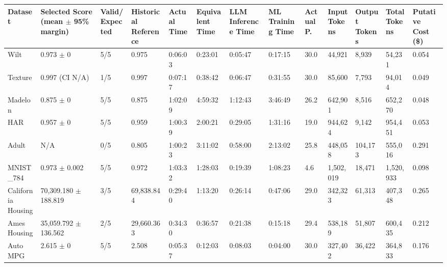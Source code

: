 \begin{tabular}{lllllllllllll}
\hline
Dataset & Selected Score (mean \ensuremath{\pm} 95\% margin) & Valid/Expected & Historical Reference & Actual Time & Equivalent Time & LLM Inference Time & ML Training Time & Actual P. & Input Tokens & Output Tokens & Total Tokens & Putative Cost (\$) \\
\hline
Wilt & 0.973 \ensuremath{\pm} 0 & 5/5 & 0.975 & 0:06:03 & 0:23:01 & 0:05:47 & 0:17:15 & 30.0 & 44,921 & 8,939 & 54,231 & 0.054 \\
Texture & 0.997 (CI N/A) & 1/5 & 0.997 & 0:07:17 & 0:38:42 & 0:06:47 & 0:31:55 & 30.0 & 85,600 & 7,793 & 94,014 & 0.049 \\
Madelon & 0.875 \ensuremath{\pm} 0 & 5/5 & 0.875 & 1:02:09 & 4:59:32 & 1:12:43 & 3:46:49 & 26.2 & 642,901 & 8,516 & 652,270 & 0.048 \\
HAR & 0.957 \ensuremath{\pm} 0 & 5/5 & 0.959 & 1:00:39 & 2:00:21 & 0:29:05 & 1:31:16 & 19.0 & 944,624 & 9,142 & 954,451 & 0.053 \\
Adult & N/A & 0/5 & 0.805 & 1:00:23 & 3:11:02 & 0:58:00 & 2:13:02 & 25.8 & 448,058 & 104,173 & 555,016 & 0.291 \\
MNIST\_784 & 0.973 \ensuremath{\pm} 0.002 & 5/5 & 0.972 & 1:03:32 & 1:28:03 & 0:19:39 & 1:08:23 & 4.6 & 1,502,019 & 18,471 & 1,520,933 & 0.098 \\
California Housing & 70,309.180 \ensuremath{\pm} 188.819 & 3/5 & 69,838.844 & 0:29:40 & 1:13:20 & 0:26:14 & 0:47:06 & 29.0 & 342,323 & 61,313 & 407,348 & 0.265 \\
Ames Housing & 35,059.792 \ensuremath{\pm} 136.562 & 2/5 & 29,660.363 & 0:34:30 & 0:36:57 & 0:21:38 & 0:15:18 & 29.4 & 538,189 & 51,807 & 600,435 & 0.212 \\
Auto MPG & 2.615 \ensuremath{\pm} 0 & 5/5 & 2.508 & 0:05:37 & 0:12:03 & 0:08:03 & 0:04:00 & 30.0 & 327,402 & 36,422 & 364,833 & 0.176 \\
\hline
\end{tabular}
